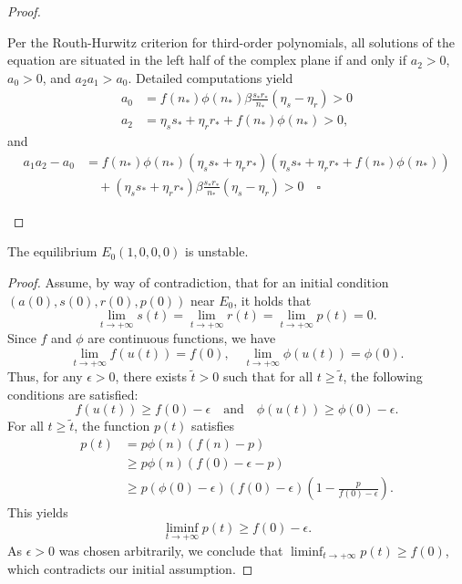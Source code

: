 \begin{proof}
\begin{enumerate}
		Per the Routh-Hurwitz criterion for third-order polynomials, all solutions of the equation are situated in the left half of the complex plane if and only if \(a_{2} > 0\), \(a_{0} > 0\), and \(a_{2}a_{1} > a_{0}\). Detailed computations yield
		\begin{align*}
			a_{0} &= f(n_{*})\phi(n_{*})\beta\frac{s_{*}r_{*}}{n_{*}}(\eta_{s} - \eta_{r}) > 0 \\
			a_{2} &= \eta_{s}s_{*} + \eta_{r}r_{*} + f(n_{*})\phi(n_{*}) > 0,
		\end{align*}
		and
		\begin{align*}
			a_{1}a_{2} - a_{0} 
			&= f(n_{*})\phi(n_{*})(\eta_{s}s_{*} + \eta_{r}r_{*})(\eta_{s}s_{*} + \eta_{r}r_{*} + f(n_{*})\phi(n_{*})) \\
			&\quad + (\eta_{s}s_{*} + \eta_{r}r_{*})\beta\frac{s_{*}r_{*}}{n_{*}}(\eta_{s} - \eta_{r}) > 0 \quad \square
		\end{align*}
		
		
		
		
		
		
		
		
	\end{enumerate}
\end{proof}
\begin{prp}
	The equilibrium \( E_0(1,0,0,0) \) is unstable.
\end{prp}
\begin{proof}
	Assume, by way of contradiction, that for an initial condition \((a(0),s(0),r(0),p(0))\) near \(E_0\), it holds that
	\[
	\lim_{t \to +\infty} s(t) = \lim_{t \to +\infty} r(t) = \lim_{t \to +\infty} p(t) = 0.
	\]
	Since \(f\) and \(\phi\) are continuous functions, we have
	\[
	\lim_{t \to +\infty} f(u(t)) = f(0), \quad \lim_{t \to +\infty} \phi(u(t)) = \phi(0).
	\]
	Thus, for any \(\epsilon > 0\), there exists \(\tilde{t} > 0\) such that for all \(t \geq \tilde{t}\), the following conditions are satisfied:
	\[
	f(u(t)) \geq f(0) - \epsilon \quad \text{and} \quad \phi(u(t)) \geq \phi(0) - \epsilon.
	\]
	For all \(t \geq \tilde{t}\), the function \(p(t)\) satisfies
	\begin{align*}
		p(t) &= p\phi(n)(f(n) - p) \\
		&\geq p\phi(n)(f(0) - \epsilon - p) \\
		&\geq p(\phi(0) - \epsilon)(f(0) - \epsilon) \left( 1 - \frac{p}{f(0) - \epsilon} \right).
	\end{align*}
	This yields
	\[
	\liminf_{t \to +\infty} p(t) \geq f(0) - \epsilon.
	\]
	As \(\epsilon > 0\) was chosen arbitrarily, we conclude that \(\liminf_{t \to +\infty} p(t) \geq f(0)\), which contradicts our initial assumption.
\end{proof}
